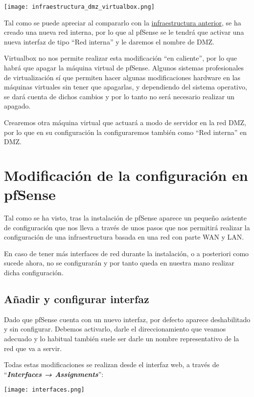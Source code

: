 \begin{center}
    \texttt{[image: infraestructura\_dmz\_virtualbox.png]}
\end{center}

Tal como se puede apreciar al compararlo con la \hyperlink{detalles_maquina_virtual}{infraestructura anterior}, se ha creado una nueva red interna, por lo que al pfSense se le tendrá que activar una nueva interfaz de tipo “Red interna” y le daremos el nombre de DMZ.

Virtualbox no nos permite realizar esta modificación “en caliente”, por lo que habrá que apagar la máquina virtual de pfSense. Algunos sistemas profesionales de virtualización sí que permiten hacer algunas modificaciones hardware en las máquinas virtuales sin tener que apagarlas, y dependiendo del sistema operativo, se dará cuenta de dichos cambios y por lo tanto no será necesario realizar un apagado.

Crearemos otra máquina virtual que actuará a modo de servidor en la red DMZ, por lo que en su configuración la configuraremos también como “Red interna” en DMZ.


\section{Modificación de la configuración en pfSense}
Tal como se ha visto, tras la instalación de pfSense aparece un pequeño asistente de configuración que nos lleva a través de unos pasos que nos permitirá realizar la configuración de una infraestructura basada en una red con parte WAN y LAN.

En caso de tener más interfaces de red durante la instalación, o a posteriori como sucede ahora, no se configurarán y por tanto queda en nuestra mano realizar dicha configuración.


\subsection{Añadir y configurar interfaz}
Dado que pfSense cuenta con un nuevo interfaz, por defecto aparece deshabilitado y sin configurar. Debemos activarlo, darle el direccionamiento que veamos adecuado y lo habitual también suele ser darle un nombre representativo de la red que va a servir.

Todas estas modificaciones se realizan desde el interfaz web, a través de “\textit{\textbf{Interfaces → Assignments}}”:

\begin{center}
    \texttt{[image: interfaces.png]}
\end{center}

